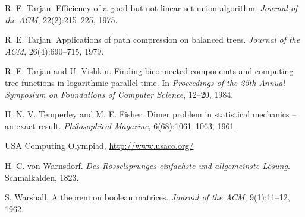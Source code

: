 \begin{thebibliography}{9}
  R. E. Tarjan.
  Efficiency of a good but not linear set union algorithm.
  \emph{Journal of the ACM}, 22(2):215--225, 1975.

  R. E. Tarjan.
  Applications of path compression on balanced trees.
  \emph{Journal of the ACM}, 26(4):690--715, 1979.

  R. E. Tarjan and U. Vishkin.
  Finding biconnected componemts and computing tree functions in logarithmic parallel time.
  In \emph{Proceedings of the 25th Annual Symposium on Foundations of Computer Science}, 12--20, 1984.

  H. N. V. Temperley and M. E. Fisher.
  Dimer problem in statistical mechanics -- an exact result.
  \emph{Philosophical Magazine}, 6(68):1061--1063, 1961.

  USA Computing Olympiad, \url{http://www.usaco.org/}

  H. C. von Warnsdorf.
  \emph{Des Rösselsprunges einfachste und allgemeinste Lösung}.
  Schmalkalden, 1823.

  S. Warshall.
  A theorem on boolean matrices.
  \emph{Journal of the ACM}, 9(1):11--12, 1962.


\end{thebibliography}
